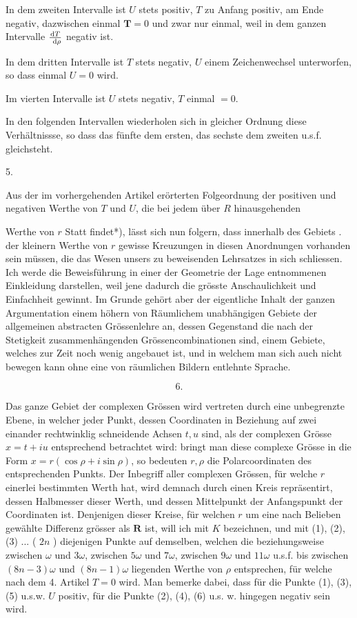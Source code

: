 \documentclass[twoside,12pt, showframe]{memoir}
\let\oldfrac\frac
\def\frac#1#2{\mathchoice{\tfrac{#1}{#2}}{\oldfrac{#1}{#2}}{\genfrac{}{}{}{2}{#1}{#2\mathstrut}}{\genfrac{}{}{}{3}{#1}{#2\mathstrut}}}
\begin{document}
In dem zweiten Intervalle ist \(U\) stets positiv, \(T\) zu Anfang positiv, am Ende negativ, dazwischen einmal \(\boldsymbol{T}=0\) und zwar nur einmal, weil in dem ganzen Intervalle \(\frac{\mathrm{d} T}{\mathrm{~d} \rho}\) negativ ist.

In dem dritten Intervalle ist \(T\) stets negativ, \(U\) einem Zeichenwechsel unterworfen, so dass einmal \(U=0\) wird.

Im vierten Intervalle ist \(U\) stets negativ, \(T\) einmal \(=0\).

In den folgenden Intervallen wiederholen sich in gleicher Ordnung diese Verhältnissse, so dass das fünfte dem ersten, das sechste dem zweiten u.s.f. gleichsteht.

5.

Aus der im vorhergehenden Artikel erörterten Folgeordnung der positiven und negativen Werthe von \(T\) und \(U\), die bei jedem über \(R\) hinausgehenden

Werthe von \(r\) Statt findet*), lässt sich nun folgern, dass innerhalb des Gebiets . der kleinern Werthe von \(r\) gewisse Kreuzungen in diesen Anordnungen vorhanden sein müssen, die das Wesen unsers zu beweisenden Lehrsatzes in sich schliessen. Ich werde die Beweisführung in einer der Geometrie der Lage entnommenen Einkleidung darstellen, weil jene dadurch die grösste Anschaulichkeit und Einfachheit gewinnt. Im Grunde gehört aber der eigentliche Inhalt der ganzen Argumentation einem höhern von Räumlichem unabhängigen Gebiete der allgemeinen abstracten Grössenlehre an, dessen Gegenstand die nach der Stetigkeit zusammenhängenden Grössencombinationen sind, einem Gebiete, welches zur Zeit noch wenig angebauet ist, und in welchem man sich auch nicht bewegen kann ohne eine von räumlichen Bildern entlehnte Sprache.

\[
6 .
\]

Das ganze Gebiet der complexen Grössen wird vertreten durch eine unbegrenzte Ebene, in welcher jeder Punkt, dessen Coordinaten in Beziehung auf zwei einander rechtwinklig schneidende Achsen \(t, u\) sind, als der complexen Grösse \(x=t+i u\) entsprechend betrachtet wird: bringt man diese complexe Grösse in die Form \(x=r(\cos \rho+i \sin \rho)\), so bedeuten \(r, \rho\) die Polarcoordinaten des entsprechenden Punkts. Der Inbegriff aller complexen Grössen, für welche \(r\) einerlei bestimmten Werth hat, wird demnach durch einen Kreis repräsentirt, dessen Halbmesser dieser Werth, und dessen Mittelpunkt der Anfangspunkt der Coordinaten ist. Denjenigen dieser Kreise, für welchen \(r\) um eine nach Belieben gewählte Differenz grösser als \(\boldsymbol{R}\) ist, will ich mit \(K\) bezeichnen, und mit (1), (2), (3) ... ( \(2 n\) ) diejenigen Punkte auf demselben, welchen die beziehungsweise zwischen \(\omega\) und \(3 \omega\), zwischen \(5 \omega\) und \(7 \omega\), zwischen \(9 \omega\) und \(11 \omega\) u.s.f. bis zwischen \((8 n-3) \omega\) und \((8 n-1) \omega\) liegenden Werthe von \(\rho\) entsprechen, für welche nach dem 4. Artikel \(T=0\) wird. Man bemerke dabei, dass für die Punkte (1), (3), (5) u.s.w. \(U\) positiv, für die Punkte (2), (4), (6) u.s. w. hingegen negativ sein wird.
\end{document}
